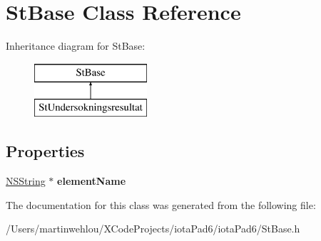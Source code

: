 \hypertarget{interface_st_base}{
\section{StBase Class Reference}
\label{interface_st_base}
}
Inheritance diagram for StBase:\begin{figure}[H]
\begin{center}
\leavevmode
\includegraphics[height=2.000000cm]{interface_st_base}
\end{center}
\end{figure}
\subsection*{Properties}
\begin{DoxyCompactItemize}
\item 
\hypertarget{interface_st_base_a8a78d596bf65fbc80f9a3be98ae35962}{
\hyperlink{class_n_s_string}{NSString} $\ast$ {\bfseries elementName}}
\label{interface_st_base_a8a78d596bf65fbc80f9a3be98ae35962}

\end{DoxyCompactItemize}


The documentation for this class was generated from the following file:\begin{DoxyCompactItemize}
\item 
/Users/martinwehlou/XCodeProjects/iotaPad6/iotaPad6/StBase.h\end{DoxyCompactItemize}
